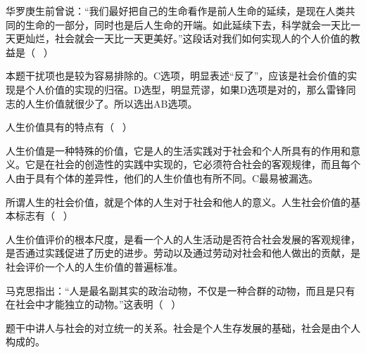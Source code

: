 \question 华罗庚生前曾说：``我们最好把自己的生命看作是前人生命的延续，是现在人类共同的生命的一部分，同时也是后人生命的开端。如此延续下去，科学就会一天比一天更灿烂，社会就会一天比一天更美好。''这段话对我们如何实现人的个人价值的教益是（
~）
\par{}
\begin{solution}本题干扰项也是较为容易排除的。C选项，明显表述``反了''，应该是社会价值的实现是个人价值的实现的归宿。D选型，明显荒谬，如果D选项是对的，那么雷锋同志的人生价值就很少了。所以选出AB选项。
\end{solution}
\question 人生价值具有的特点有（ ~）
\par\twoch{\textcolor{red}{客观性}}{\textcolor{red}{社会性}}{\textcolor{red}{差异性}}{\textcolor{red}{创造性}}
\begin{solution}人生价值是一种特殊的价值，它是人的生活实践对于社会和个人所具有的作用和意义。它是在社会的创造性的实践中实现的，它必须符合社会的客观规律，而且每个人由于具有个体的差异性，他们的人生价值也有所不同。C最易被漏选。
\end{solution}
\question 所谓人生的社会价值，就是个体的人生对于社会和他人的意义。人生社会价值的基本标志有（
~）
\par{}
\begin{solution}人生价值评价的根本尺度，是看一个人的人生活动是否符合社会发展的客观规律，是否通过实践促进了历史的进步。劳动以及通过劳动对社会和他人做出的贡献，是社会评价一个人的人生价值的普遍标准。
\end{solution}
\question 马克思指出：``人是最名副其实的政治动物，不仅是一种合群的动物，而且是只有在社会中才能独立的动物。''这表明（
~）
\par\fourch{\textcolor{red}{社会是个人生存和发展的基础}}{\textcolor{red}{个人是构成社会的前提}}{\textcolor{red}{个人与社会不可分离}}{\textcolor{red}{个人与社会是对立统一的}}
\begin{solution}题干中讲人与社会的对立统一的关系。社会是个人生存发展的基础，社会是由个人构成的。
\end{solution}
